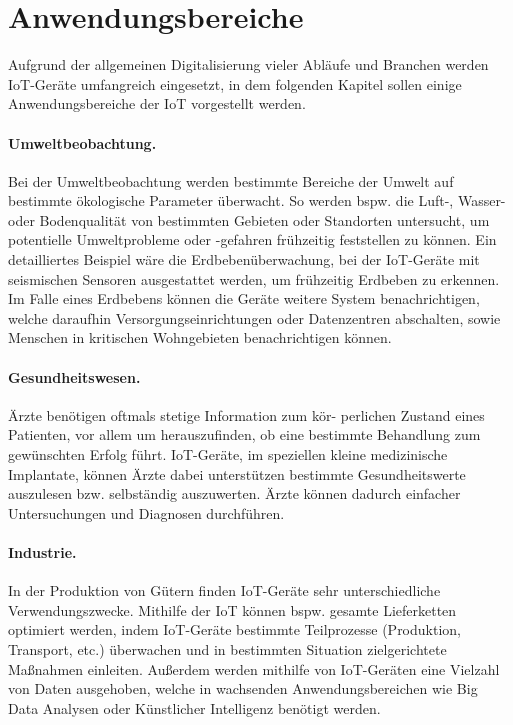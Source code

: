\section{Anwendungsbereiche}
Aufgrund der allgemeinen Digitalisierung vieler Abläufe und Branchen werden IoT-Geräte umfangreich eingesetzt,
in dem folgenden Kapitel sollen einige Anwendungsbereiche der IoT vorgestellt werden. 

\paragraph{Umweltbeobachtung.}
Bei der Umweltbeobachtung werden bestimmte Bereiche der Umwelt auf bestimmte ökologische Parameter überwacht. 
So werden bspw. die Luft-, Wasser- oder Bodenqualität von bestimmten Gebieten oder Standorten 
untersucht, um potentielle Umweltprobleme oder -gefahren frühzeitig feststellen zu können. 
Ein detailliertes Beispiel wäre die Erdbebenüberwachung, bei der IoT-Geräte mit seismischen Sensoren
ausgestattet werden, um frühzeitig Erdbeben zu erkennen. Im Falle eines Erdbebens können die Geräte
weitere System benachrichtigen, welche daraufhin Versorgungseinrichtungen oder  Datenzentren
abschalten, sowie Menschen in kritischen Wohngebieten benachrichtigen können. \cite{paper}

\paragraph{Gesundheitswesen.}
Ärzte benötigen oftmals stetige Information zum kör- perlichen Zustand eines Patienten, vor allem um
herauszufinden, ob eine bestimmte Behandlung zum gewünschten Erfolg führt. IoT-Geräte, im speziellen
kleine medizinische Implantate, können Ärzte dabei unterstützen bestimmte Gesundheitswerte auszulesen bzw. 
selbständig auszuwerten. Ärzte können dadurch einfacher Untersuchungen und Diagnosen durchführen. \cite{paper}

\paragraph{Industrie.}
In der Produktion von Gütern finden IoT-Geräte sehr unterschiedliche Verwendungszwecke. Mithilfe der IoT können
bspw. gesamte Lieferketten optimiert werden, indem IoT-Geräte bestimmte Teilprozesse (Produktion, Transport, etc.)
überwachen und in bestimmten Situation zielgerichtete Maßnahmen einleiten. Außerdem werden mithilfe von IoT-Geräten eine 
Vielzahl von Daten ausgehoben, welche in wachsenden Anwendungsbereichen wie Big Data Analysen oder Künstlicher Intelligenz 
benötigt werden. \cite{paper}

